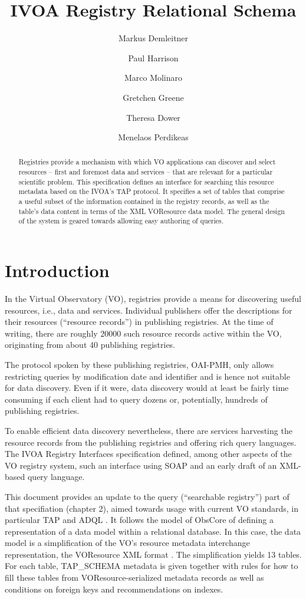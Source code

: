 \documentclass[11pt,a4paper]{ivoa}
\author[http://www.ivoa.net/cgi-bin/twiki/bin/view/IVOA/MarkusDemleitner]{Markus Demleitner}
\author[http://www.ivoa.net/cgi-bin/twiki/bin/view/IVOA/PaulHarrison]{Paul Harrison}
\author[http://www.ivoa.net/cgi-bin/twiki/bin/view/IVOA/MarcoMolinaro]{Marco Molinaro}
\author[http://www.ivoa.net/cgi-bin/twiki/bin/view/IVOA/GretchenGreene]{Gretchen Greene}
\author[http://www.ivoa.net/cgi-bin/twiki/bin/view/IVOA/TheresaDower]{Theresa Dower}
\author[http://wiki.ivoa.net/twiki/bin/view/IVOA/MenelaosPerdikeas]{Menelaos Perdikeas}
\title{IVOA Registry Relational Schema}
\begin{document}
\begin{abstract}
Registries provide a mechanism with which VO applications can
discover and select resources -- first and foremost data and
services -- that are relevant for a particular scientific problem.
This specification defines  an interface for searching this resource
metadata based on the IVOA's TAP protocol.  It specifies a set of tables
that comprise a useful subset of the information contained in the
registry records, as well as the table's data content in terms of the
XML VOResource data model.  The general design of the system is geared
towards allowing easy authoring of queries.
\end{abstract}


\section{Introduction}

\label{intro}

In the Virtual Observatory (VO), registries provide a means for
discovering useful resources, i.e., data and services.  Individual
publishers offer the descriptions for their resources (``resource
records'') in publishing registries.  At the time of writing, there are
roughly 20000 such resource records active within the VO, originating
from about 40 publishing registries.

The protocol spoken by these
publishing registries, OAI-PMH, only allows restricting queries by
modification date and identifier and is hence not suitable for data discovery.
Even if it were, data discovery would at least be fairly time consuming if
each client had to query dozens or, potentially, hundreds of
publishing registries.

To enable efficient data discovery nevertheless, there are services harvesting the
resource records from the publishing registries and offering rich query
languages.
The IVOA Registry
Interfaces specification \citep{std:RI1} defined, among other aspects of
the VO registry system, such an interface
using SOAP and an early draft of an XML-based query language.

This document provides an update to the query (``searchable registry'') part
of that specifiation (chapter 2), aimed towards
usage with current VO standards, in particular TAP \citep{std:TAP}
and ADQL \citep{std:ADQL}.  It follows the model of ObsCore
\citep{std:OBSCORE} of defining a representation of a data model
within a relational database.  In this case, the data model is a
simplification of the VO's resource metadata interchange representation,
the VOResource XML format \citep{std:VOR}.  The simplification
yields 13 tables.  For each table, TAP\_SCHEMA metadata is given together
with rules for how to fill these tables from VOResource-serialized
metadata records as well as conditions on foreign keys and
recommendations on indexes.
\end{document}
